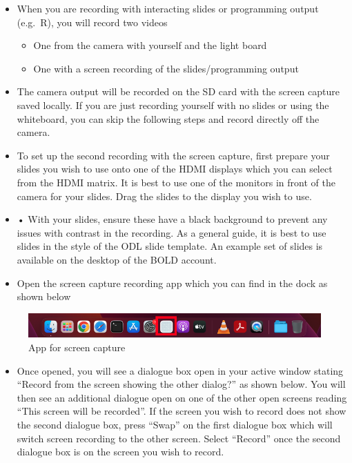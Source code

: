 \documentclass[
]{book}
\providecommand{\tightlist}{%
  \setlength{\itemsep}{0pt}\setlength{\parskip}{0pt}}
\begin{document}
\begin{itemize}
\item
  When you are recording with interacting slides or programming output (e.g.~R), you will record two videos

  \begin{itemize}
  \tightlist
  \item
    One from the camera with yourself and the light board
  \item
    One with a screen recording of the slides/programming output
  \end{itemize}
\item
  The camera output will be recorded on the SD card with the screen capture saved locally. If you are just recording yourself with no slides or using the whiteboard, you can skip the following steps and record directly off the camera.
\item
  To set up the second recording with the screen capture, first prepare your slides you wish to use onto one of the HDMI displays which you can select from the HDMI matrix. It is best to use one of the monitors in front of the camera for your slides. Drag the slides to the display you wish to use.
\item
  • With your slides, ensure these have a black background to prevent any issues with contrast in the recording. As a general guide, it is best to use slides in the style of the ODL slide template. An example set of slides is available on the desktop of the BOLD account.
\item
  Open the screen capture recording app which you can find in the dock as shown below
\end{itemize}

\begin{figure}

{\centering \includegraphics[width=1\linewidth]{App} 

}

\caption{App for screen capture}\label{fig:app}
\end{figure}

\begin{itemize}
\tightlist
\item
  Once opened, you will see a dialogue box open in your active window stating ``Record from the screen showing the other dialog?'' as shown below. You will then see an additional dialogue open on one of the other open screens reading ``This screen will be recorded''. If the screen you wish to record does not show the second dialogue box, press ``Swap'' on the first dialogue box which will switch screen recording to the other screen. Select ``Record'' once the second dialogue box is on the screen you wish to record.
\end{itemize}
\end{document}

